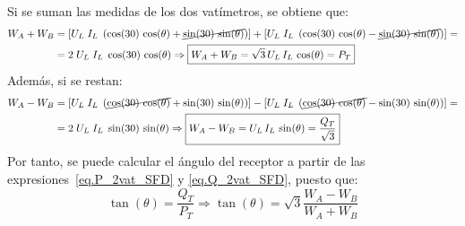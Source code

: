 \documentclass[11pt]{book} %
\numberwithin{dummy}{section}
\theoremstyle{ocrenumbox}
\theoremstyle{blacknumex}
\theoremstyle{blacknumbox}
\theoremstyle{ocrenum}
\begin{document}
Si se suman las medidas de los dos vatímetros, se obtiene que:
\begin{align}\label{eq.P_2vat_SFD}
    W_A+W_B&=\left[ U_L\;I_L\;\left( \cos({30})\,\cos(\theta) + \cancel{\sin({30})\,\sin(\theta)}\right) \right] + \left[U_L\;I_L\;\left( \cos({30})\,\cos(\theta) - \cancel{\sin({30})\,\sin(\theta)}\right) \right]=\nonumber\\
    &= 2\; U_L\;I_L\;\cos({30})\,\cos(\theta) \Rightarrow \boxed{W_A + W_B = \sqrt{3}\,U_L\, I_L\,\cos(\theta) = P_T}
\end{align}
Además, si se restan: 
\begin{align}\label{eq.Q_2vat_SFD}
    W_A-W_B&=\left[ U_L\;I_L\;\left( \cancel{\cos({30})\,\cos(\theta)} + \sin({30})\,\sin(\theta)\right) \right] - \left[U_L\;I_L\;\left( \cancel{\cos({30})\,\cos(\theta)} - \sin({30})\,\sin(\theta)\right) \right]=\nonumber\\
    &= 2\; U_L\;I_L\;\sin({30})\,\sin(\theta) \Rightarrow \boxed{W_A - W_B = U_L\, I_L\,\sin(\theta) = \dfrac{Q_T}{\sqrt{3}}}
\end{align}
Por tanto, se puede calcular el ángulo del receptor a partir de las expresiones~\eqref{eq.P_2vat_SFD} y \eqref{eq.Q_2vat_SFD}, puesto que:
\begin{equation}
    \tan(\theta) = \dfrac{Q_T}{P_T}\Rightarrow \boxed{\tan(\theta) = \sqrt{3} \frac{W_A - W_B}{W_A + W_B}}
\end{equation}
\end{document}
